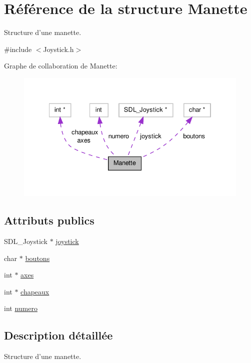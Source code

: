 \hypertarget{structManette}{\section{Référence de la structure Manette}
\label{structManette}
}


Structure d'une manette.  




{\ttfamily \#include $<$Joystick.\-h$>$}



Graphe de collaboration de Manette\-:\nopagebreak
\begin{figure}[H]
\begin{center}
\leavevmode
\includegraphics[width=334pt]{structManette__coll__graph}
\end{center}
\end{figure}
\subsection*{Attributs publics}
\begin{DoxyCompactItemize}
\item 
S\-D\-L\-\_\-\-Joystick $\ast$ \hyperlink{structManette_ad11c45cf2d1afa059fae52ab61a177d8}{joystick}
\item 
char $\ast$ \hyperlink{structManette_a07814b5f1ebd865b6e15d2094cf5d671}{boutons}
\item 
int $\ast$ \hyperlink{structManette_abc9f5234f07d79af9735b501956a8d60}{axes}
\item 
int $\ast$ \hyperlink{structManette_ab12d322b8fadc5e42218b065e7f86d65}{chapeaux}
\item 
int \hyperlink{structManette_aedc72637b122d8d34ce23f4cf98be10b}{numero}
\end{DoxyCompactItemize}


\subsection{Description détaillée}
Structure d'une manette. 

